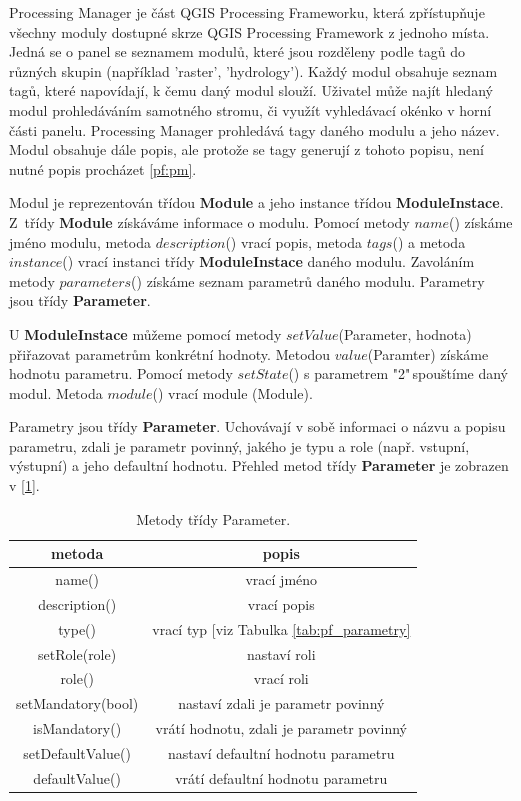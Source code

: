 Processing Manager je část QGIS Processing Frameworku, která
zpřístupňuje všechny moduly dostupné skrze QGIS Processing Framework z
jednoho místa. Jedná se o panel se seznamem modulů, které jsou
rozděleny podle tagů do různých skupin (například 'raster',
'hydrology'). Každý modul obsahuje seznam tagů, které napovídají, k
čemu daný modul slouží. Uživatel může najít hledaný modul
prohledáváním samotného stromu, či využít vyhledávací okénko v horní
části panelu. Processing Manager prohledává tagy daného modulu a jeho
název. Modul obsahuje dále popis, ale protože se tagy generují z
tohoto popisu, není nutné popis procházet \figurename \ref{pf:pm}.

Modul je reprezentován třídou \textbf{Module} a jeho instance
třídou \textbf{ModuleInstace}. Z~třídy \textbf{Module} získáváme
informace o modulu. Pomocí metody $name$() získáme jméno modulu,
metoda $description$() vrací popis, metoda $tags$() a metoda
$instance$() vrací instanci třídy \textbf{ModuleInstace} daného
modulu. Zavoláním metody $parameters$() získáme seznam parametrů
daného modulu. Parametry jsou třídy \textbf{Parameter}.

U \textbf{ModuleInstace} můžeme pomocí metody $setValue$(Parameter,
hodnota) přiřazovat parametrům konkrétní hodnoty. Metodou
$value$(Paramter) získáme hodnotu parametru. Pomocí metody
$setState$() s parametrem "2"\,spouštíme daný modul. Metoda $module$()
vrací module (Module).

Parametry jsou třídy \textbf{Parameter}. Uchovávají v sobě informaci o
názvu a popisu parametru, zdali je parametr povinný, jakého je typu a
role (např. vstupní, výstupní) a jeho defaultní hodnotu. Přehled metod
třídy \textbf{Parameter} je zobrazen v [\tablename \ref{tab:metPar}].

\begin{table}[!]
	\centering
	\begin{tabular}{|c|c|}
	\hline
	{\bf metoda} & {\bf popis} \\
	\hline
	\hline
	name() & vrací jméno\\
	description() & vrací popis\\
	type() & vrací typ [viz Tabulka \ref{tab:pf_parametry} \\
	setRole(role) & nastaví roli\\
	role() & vrací roli\\
	setMandatory(bool) & nastaví zdali je parametr povinný\\
	isMandatory() & vrátí hodnotu, zdali je parametr povinný\\
	setDefaultValue() & nastaví defaultní hodnotu parametru\\
	defaultValue() & vrátí defaultní hodnotu parametru \\
	\hline
	\end{tabular}
	\caption{Metody třídy Parameter.}
	\label{tab:metPar}
\end{table}

